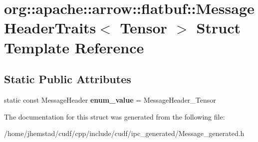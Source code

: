 \hypertarget{structorg_1_1apache_1_1arrow_1_1flatbuf_1_1MessageHeaderTraits_3_01Tensor_01_4}{}\section{org\+:\+:apache\+:\+:arrow\+:\+:flatbuf\+:\+:Message\+Header\+Traits$<$ Tensor $>$ Struct Template Reference}
\label{structorg_1_1apache_1_1arrow_1_1flatbuf_1_1MessageHeaderTraits_3_01Tensor_01_4}
\subsection*{Static Public Attributes}
\begin{DoxyCompactItemize}
\item 
static const Message\+Header {\bfseries enum\+\_\+value} = Message\+Header\+\_\+\+Tensor\hypertarget{structorg_1_1apache_1_1arrow_1_1flatbuf_1_1MessageHeaderTraits_3_01Tensor_01_4_a6348d08a5affac10752eea14954bf4a9}{}\label{structorg_1_1apache_1_1arrow_1_1flatbuf_1_1MessageHeaderTraits_3_01Tensor_01_4_a6348d08a5affac10752eea14954bf4a9}

\end{DoxyCompactItemize}


The documentation for this struct was generated from the following file\+:\begin{DoxyCompactItemize}
\item 
/home/jhemstad/cudf/cpp/include/cudf/ipc\+\_\+generated/Message\+\_\+generated.\+h\end{DoxyCompactItemize}
